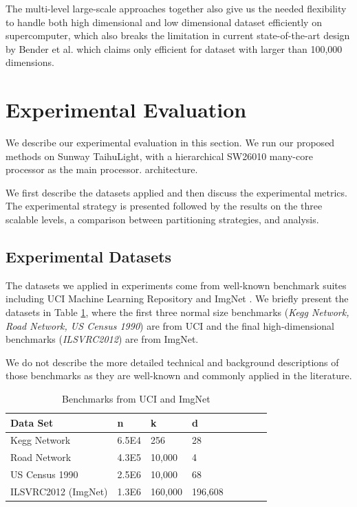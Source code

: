 The multi-level large-scale approaches together also give us the needed flexibility to handle both high dimensional and low dimensional dataset efficiently on supercomputer, which also breaks the limitation in current state-of-the-art design by Bender et al. \cite{bender2015k} which claims only efficient for dataset with larger than 100,000 dimensions. 


\section{Experimental Evaluation}
We describe our experimental evaluation in this section. We run our proposed methods on Sunway TaihuLight, with a hierarchical SW26010 many-core processor as the main processor. architecture. 

We first describe the datasets applied and then discuss the experimental metrics. The experimental strategy is presented followed by the results on the three scalable levels, a comparison between partitioning strategies, and analysis. 


\subsection{Experimental Datasets}
The datasets we applied in experiments come from well-known benchmark suites including UCI Machine Learning Repository\cite{uci} and ImgNet \cite{imgnet}. We briefly present the datasets in Table \ref{t1}, where the first three normal size benchmarks ({\it Kegg Network, Road Network, US Census 1990}) are from UCI and the final high-dimensional benchmarks ({\it ILSVRC2012}) are from ImgNet.

We do not describe the more detailed technical and background descriptions of those benchmarks as they are well-known and commonly applied in the literature. 

\begin{table}
  \caption{Benchmarks from UCI and ImgNet}
  \label{t1}
   \begin{tabular}{p{2.5cm} p{1.5cm} p{1.5cm}p{1.5cm} c c c c}
   \toprule[1pt]
    Data Set &n & k & d\\
    \toprule[1pt]
    Kegg Network &6.5E4 &256 &28  \\
    Road Network &4.3E5 &10,000 &4 \\
    US Census 1990 &2.5E6 &10,000 &68 \\
    \midrule
    ILSVRC2012 (ImgNet) &1.3E6 &160,000 &196,608 \\
    \bottomrule
  \end{tabular}
\end{table}


